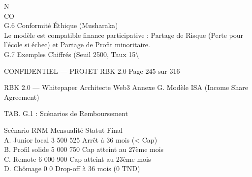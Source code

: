\documentclass[12pt,landscape,a4paper]{article}
\newenvironment{confidential}
{\begin{tcolorbox}[
    colback=rbkred!5!white,
    colframe=rbkred!75!black,
    title=CONFIDENTIEL,
    fonttitle=\bfseries\color{white},
    coltitle=rbkred!75!black,
    breakable,
    enhanced,
    frame hidden,
    borderline west={2pt}{0pt}{rbkred!75!black}
]}
{\end{tcolorbox}}
\begin{document}
\vspace{0.5em}
\vspace{0.5em}
\vspace{0.5em}
N\\
CO\\
G.6 Conformité Éthique (Musharaka)\\
Le modèle est compatible finance participative : Partage de Risque (Perte pour l’école si échec) et Partage de Profit minoritaire.\\
\vspace{0.5em}
\vspace{0.5em}
\vspace{0.5em}
G.7 Exemples Chiffrés (Seuil 2500, Taux 15\textbackslash{}%
\vspace{0.5em}
\vspace{0.5em}
\vspace{0.5em}
\vspace{0.5em}
\begin{confidential}CONFIDENTIEL — PROJET RBK 2.0                                           Page 245 sur 316\end{confidential}
RBK 2.0 — Whitepaper Architecte Web3                                                     Annexe G. Modèle ISA (Income Share Agreement)\\
\vspace{0.5em}
\vspace{0.5em}
\vspace{0.5em}
\vspace{0.5em}
\begin{center}\begin{tabular}TAB. G.1 : Scénarios de Remboursement\end{tabular}\end{center}
\vspace{0.5em}
\vspace{0.5em}
Scénario         RNM Mensualité Statut Final\\
A. Junior local 3 500 525       Arrêt à 36 mois (\textless{} Cap)\\
B. Profil solide 5 000 750      Cap atteint au 27ème mois\\
C. Remote        6 000 900      Cap atteint au 23ème mois\\
D. Chômage       0     0        Drop-off à 36 mois (0 TND)\\
\vspace{0.5em}
\vspace{0.5em}
\vspace{0.5em}
\end{document}
